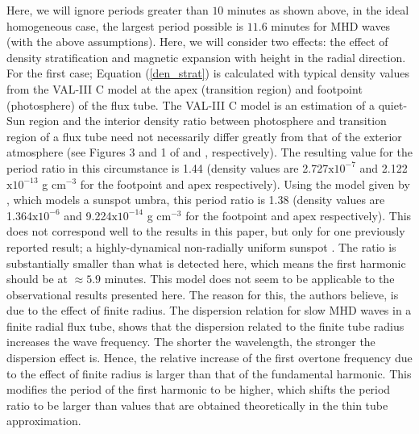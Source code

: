 	Here, we will ignore periods greater than $10$ minutes as shown above, in the ideal homogeneous case, the largest period possible is $11.6$ minutes for MHD waves (with the above assumptions).
	Here, we will consider two effects: the effect of density stratification and magnetic expansion with height in the radial direction.
	For the first case; Equation (\ref{den_strat}) is calculated with typical density values from the VAL-III C model \citet{1981ApJS...45..635V} at the apex (transition region) and footpoint (photosphere) of the flux tube.
	The VAL-III C model is an estimation of a quiet-Sun region and the interior density ratio between photosphere and transition region of a flux tube need not necessarily differ greatly from that of the exterior atmosphere (see Figures 3 and 1 of \citealp{GFME13a} and \citealp{GFE14}, respectively). 
	The resulting value for the period ratio in this circumstance is 1.44 (density values are 2.727$\mathrm{x}10^{-7}$ and 2.122$\mathrm{x}10^{-13}$ g cm$^{-3}$ for the footpoint and apex respectively).
	Using the model given by \citet{Maltby1986}, which models a sunspot umbra, this period ratio is 1.38 (density values are 1.364$\mathrm{x}10^{-6}$ and 9.224$\mathrm{x}10^{-14}$ g cm$^{-3}$ for the footpoint and apex respectively).
	This does not correspond well to the results in this paper, but only for one previously reported result; a highly-dynamical non-radially uniform sunspot \citep{Dorotovic2014}.
	The ratio is substantially smaller than what is detected here, which means the first harmonic should be at $\approx 5.9$ minutes.
	This model does not seem to be applicable to the observational results presented here. 
	The reason for this, the authors believe, is due to the effect of finite radius.
	The dispersion relation for slow MHD waves in a finite radial flux tube, shows that the dispersion related to the finite tube radius increases the wave frequency.
	The shorter the wavelength, the stronger the dispersion effect is.
	Hence, the relative increase of the first overtone frequency due to the effect of finite radius is larger than that of the fundamental harmonic.
	This modifies the period of the first harmonic to be higher, which shifts the period ratio to be larger than values that are obtained theoretically in the thin tube approximation.
    
